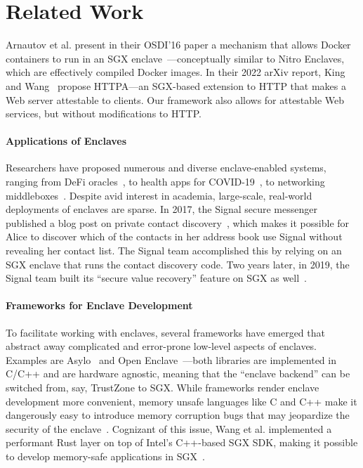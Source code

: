 \section{Related Work}
\label{sec:related-work}

Arnautov et al. present in their OSDI'16 paper a mechanism that allows Docker
containers to run in an SGX enclave~\cite{Arnautov2016a}---conceptually similar
to Nitro Enclaves, which are effectively compiled Docker images.
%
In their 2022 arXiv report, King and Wang~\cite{King2022a} propose HTTPA---an
SGX-based extension to HTTP that makes a Web server attestable to clients.  Our
framework also allows for attestable Web services, but without modifications to
HTTP.

\paragraph{Applications of Enclaves}

Researchers have proposed numerous and diverse enclave-enabled systems, ranging
from DeFi oracles~\cite{Zhang16a}, to health apps for
COVID-19~\cite{Mailthody21a}, to networking middleboxes~\cite{Han17a}.  Despite
avid interest in academia, large-scale, real-world deployments of enclaves are
sparse.  In 2017, the Signal secure messenger published a blog post on private
contact discovery~\cite{Marlinspike17a}, which makes it possible for Alice to
discover which of the contacts in her address book use Signal without revealing
her contact list.  The Signal team accomplished this by relying on an SGX
enclave that runs the contact discovery code.  Two years later, in 2019, the
Signal team built its ``secure value recovery'' feature on SGX as
well~\cite{Lund19a}.

\paragraph{Frameworks for Enclave Development}

To facilitate working with enclaves, several frameworks have emerged that
abstract away complicated and error-prone low-level aspects of enclaves.
Examples are Asylo~\cite{asylo} and Open Enclave~\cite{openenclave}---both
libraries are implemented in C/C++ and are hardware agnostic, meaning that the
``enclave backend'' can be switched from, say, TrustZone to SGX.  While
frameworks render enclave development more convenient, memory unsafe languages
like C and C++ make it dangerously easy to introduce memory corruption bugs
that may jeopardize the security of the enclave~\cite{Lee2017a}.  Cognizant of
this issue, Wang et al. implemented a performant Rust layer on top of Intel's
C++-based SGX SDK, making it possible to develop memory-safe applications in
SGX~\cite{Wang2019a}.

